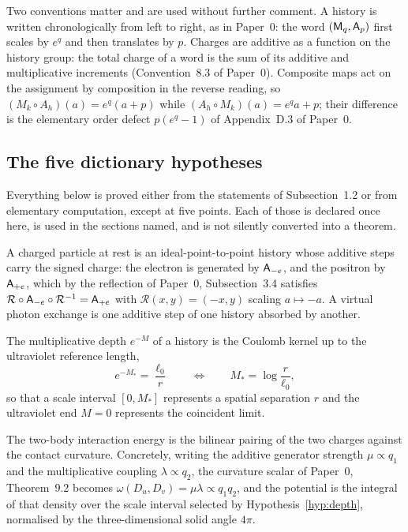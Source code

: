 Two conventions matter and are used without further comment.  A history is
written chronologically from left to right, as in Paper~0: the word
$(\mathsf M_q,\mathsf A_p)$ first scales by $e^{q}$ and then translates by $p$.  Charges
are additive as a function on the history group: the total charge of a word is
the sum of its additive and multiplicative increments
(Convention~8.3 of Paper~0).  Composite maps act on the assignment by
composition in the reverse reading, so $(M_k\circ A_h)(a)=e^{q}(a+p)$ while
$(A_h\circ M_k)(a)=e^{q}a+p$; their difference is the elementary order defect
$p(e^{q}-1)$ of Appendix~D.3 of Paper~0.

\subsection{The five dictionary hypotheses}

Everything below is proved either from the \AEG{} statements of
Subsection~1.2 or from elementary computation, except at five points.  Each of
those is declared once here, is used in the sections named, and is not silently
converted into a theorem.

\begin{hypothesis}
\label{hyp:charge}
A charged particle at rest is an ideal-point-to-point history whose additive
steps carry the signed charge: the electron is generated by
$\mathsf A_{-e}$, and the positron by $\mathsf A_{+e}$, which by the reflection of
Paper~0, Subsection~3.4 satisfies $\mathcal R\circ\mathsf A_{-e}\circ\mathcal R^{-1}
=\mathsf A_{+e}$ with $\mathcal R(x,y)=(-x,y)$ scaling $a\mapsto-a$.  A virtual
photon exchange is one additive step of one history absorbed by another.
\end{hypothesis}

\begin{hypothesis}
\label{hyp:depth}
The multiplicative depth $e^{-M}$ of a history is the Coulomb kernel up to the
ultraviolet reference length,
\[
  e^{-M_*}=\frac{\ell_0}{r}
  \qquad\Longleftrightarrow\qquad
  M_*=\log\frac{r}{\ell_0},
\]
so that a scale interval $[0,M_*]$ represents a spatial separation $r$ and the
ultraviolet end $M=0$ represents the coincident limit.
\end{hypothesis}

\begin{hypothesis}
\label{hyp:pairing}
The two-body interaction energy is the bilinear pairing of the two charges
against the contact curvature.  Concretely, writing the additive generator
strength $\mu\propto q_1$ and the multiplicative coupling $\lambda\propto q_2$,
the curvature scalar of Paper~0, Theorem~9.2 becomes
$\omega(D_u,D_v)=\mu\lambda\propto q_1q_2$, and the potential is the integral of
that density over the scale interval selected by Hypothesis~\ref{hyp:depth},
normalised by the three-dimensional solid angle $4\pi$.
\end{hypothesis}

